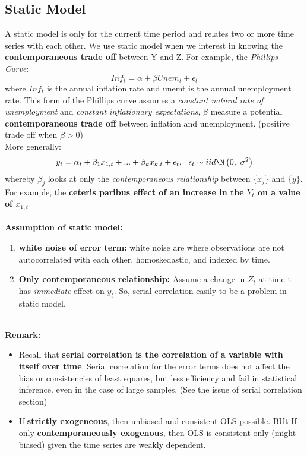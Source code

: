\documentclass[12pt]{article}
\begin{document}
\newpage
{\color{RoyalBlue}
\subsection{Static Model}}
A static model is only for the current time period and relates two or more time series with each other. We use static model when we interest in knowing the \textbf{contemporaneous trade off} between Y and Z. For example, the \textit{Phillips Curve}:
\begin{equation}
   Inf_t = \alpha + \beta Unem_t + \epsilon_t
\end{equation}
where $Inf_t$ is the annual inflation rate and unemt is the annual unemployment rate. This form of the Phillips curve assumes a \textit{constant natural rate of unemployment} and \textit {constant inflationary expectations}, $\beta$ measure a potential \textbf{contemporaneous trade off} between inflation and unemployment. (positive trade off when $\beta > 0 $)
\\
More generally:
\begin{equation}
    y_t =\alpha_t + \beta_1 x_{1,t} +...+\beta_k x_{k,t} +\epsilon_t,\ \   \epsilon_t \sim iid \N\left(0,\ \sigma^2\right)
\end{equation}
whereby $\beta_j$ looks at only the \textit{contemporaneous relationship} between $\{x_j\}$ and $\{y\}$. For example, the \textbf{ceteris paribus effect of an
increase in the $Y_t$ on a value of $x_{1,t}$}
\\
\\
\noindent
{\color{DarkOrchid}
\textbf{ Assumption of static model: }}
\begin{enumerate}
  \item \textbf{white noise of error term: } white noise are where observations are not autocorrelated with each other, homoskedastic, and indexed by time.
  \item \textbf{Only contemporaneous relationship: } Assume a change in $Z_t$ at time t has \textit{immediate} effect on $y_t$. So, serial correlation easily to be a problem in static model.
\end{enumerate}


\\

\noindent
{\color{ForestGreen}\textbf{Remark: }} 
\begin{itemize}
\item 
Recall that \textbf{serial correlation is the correlation of a variable with itself over time}. Serial correlation for the error terms does not affect the bias or consistencies of least squares, but less efficiency and fail in statistical inference. even in the case of large samples.  (See the issue of serial correlation section)
\item
If \textbf{strictly exogeneous}, then unbiased and consistent OLS possible. BUt If only \textbf{contemporaneously exogenous}, then OLS is consistent only (might biased) given the time series are weakly dependent. 
\end{itemize}
\end{document}
